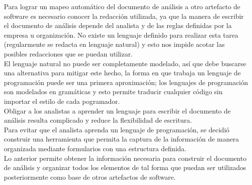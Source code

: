 Para lograr un mapeo automático del documento de análisis a otro artefacto de software es necesario conocer la redacción utilizada, ya que la manera de escribir 
el documento de análisis depende del analista y de las reglas definidas por la empresa u organización. No existe un lenguaje definido para realizar esta tarea
(regularmente se redacta en lenguaje natural) y esto nos impide acotar las posibles redacciones que se puedan utilizar.\\

El lenguaje natural no puede ser completamente modelado, así que debe buscarse una alternativa para mitigar este hecho, la forma en que trabaja un lenguaje de programación 
puede ser una primera aproximación; los lenguajes de programación son modelados en gramáticas y esto permite traducir cualquier código sin importar el estilo de cada pogramador. \\

Obligar a los analistas a aprender un lenguaje para escribir el documento de análisis resulta complicado y reduce la flexibilidad de escritura. \\

Para evitar que el analista aprenda un lenguaje de programación, se decidió construir una herramienta que permita la
captura de la información de manera organizada mediante formularios con una
estructura definida.\\

Lo anterior permite obtener la información necesaria para construir el documento de análisis y 
organizar todos los elementos de tal forma que puedan ser utilizados posteriormente como base de otros 
artefactos de software.\\
